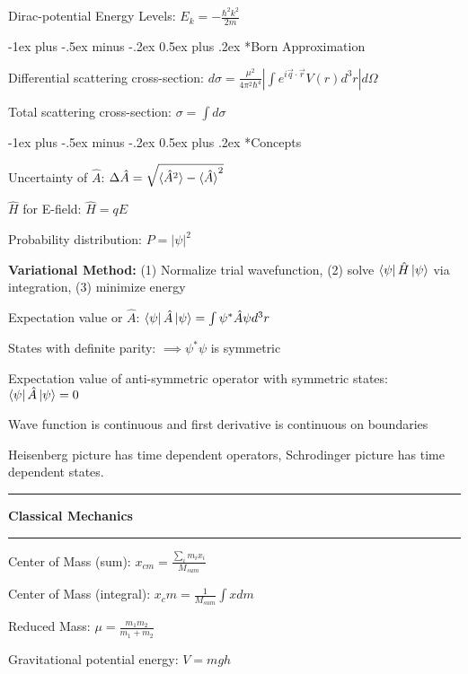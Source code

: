 \documentclass[10pt,landscape]{article}
\makeatletter
\renewcommand{\section}{\@startsection{section}{1}{0mm}%
                                {-1ex plus -.5ex minus -.2ex}%
                                {0.5ex plus .2ex}%
                                {\normalfont\large\bfseries}}
\makeatother
\begin{document}
\begin{multicols}{3}
Dirac-potential Energy Levels:
$E_k = -\frac{\hbar^2 k^2}{2m}$

\section*{Born Approximation}

Differential scattering cross-section:
$d\sigma = \frac{\mu^2}{4\pi^2 \hbar^4}|\int e^{i\vec{q}\cdot\vec{r}} V(r) d^3r| d\Omega$

Total scattering cross-section:
$\sigma = \int d\sigma$

\section*{Concepts}

Uncertainty of $\hat{A}$:
$\Delta \hat{A} = \sqrt{\braket{\hat{A}^2} - \braket{\hat{A}}^2}$

$\hat{H}$ for E-field:
$\hat{H} = qE$

Probability distribution:
$P = |\psi|^2$

\textbf{Variational Method:} (1) Normalize trial wavefunction, (2) solve $\bra{\psi}\hat{H}\ket{\psi}$ via integration, (3) minimize energy

Expectation value or $\hat{A}$:
$\bra{\psi}\hat{A}\ket{\psi} = \int \psi^* \hat{A} \psi d^3r$

States with definite parity:
$\implies \psi^* \psi$ is symmetric

Expectation value of anti-symmetric operator with symmetric states:
$\bra{\psi}\hat{A}\ket{\psi} = 0$

Wave function is continuous and first derivative is continuous on boundaries

Heisenberg picture has time dependent operators, Schrodinger picture has time dependent states.

\hrule

\begin{center}
     \Large{\textbf{Classical Mechanics}} \\
     \hrule
\end{center}

Center of Mass (sum):
$x_{cm} = \frac{\sum_i m_ix_i}{M_{sum}}$

Center of Mass (integral):
$x_cm = \frac{1}{M_{sum}} \int x dm$

Reduced Mass:
$\mu = \frac{m_1 m_2}{m_1 + m_2}$

Gravitational potential energy:
$V = mgh$


\end{multicols}
\end{document}
